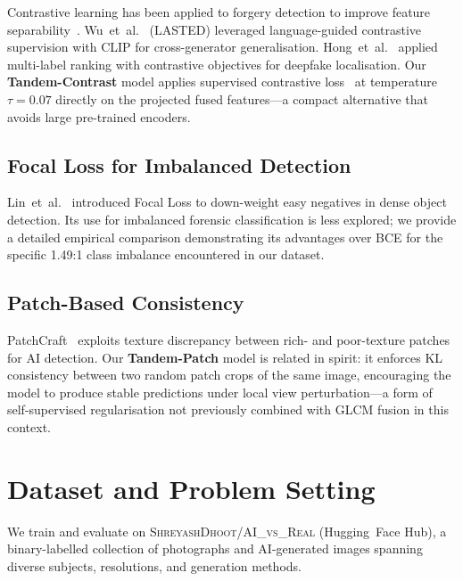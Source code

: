 \documentclass[10pt,twocolumn]{article}
\begin{document}
Contrastive learning has been applied to forgery detection to improve
feature separability~\cite{wu2023lasted,hong2024contrastive,
niloy2023cfl,gu2022hierarchical}.
Wu~et~al.~\cite{wu2023lasted} (LASTED) leveraged language-guided
contrastive supervision with CLIP for cross-generator generalisation.
Hong~et~al.~\cite{hong2024contrastive} applied multi-label ranking
with contrastive objectives for deepfake localisation.
Our \textbf{Tandem-Contrast} model applies supervised contrastive
loss~\cite{khosla2020supervised} at temperature $\tau=0.07$ directly
on the projected fused features---a compact alternative that avoids
large pre-trained encoders.

\subsection{Focal Loss for Imbalanced Detection}

Lin~et~al.~\cite{lin2017focal} introduced Focal Loss to down-weight
easy negatives in dense object detection.
Its use for imbalanced forensic classification is less
explored; we provide a detailed empirical comparison demonstrating its
advantages over BCE for the specific 1.49:1 class imbalance
encountered in our dataset.

\subsection{Patch-Based Consistency}

PatchCraft~\cite{zhong2023patchcraft} exploits texture discrepancy
between rich- and poor-texture patches for AI detection.
Our \textbf{Tandem-Patch} model is related in spirit: it enforces KL
consistency between two random patch crops of the same image,
encouraging the model to produce stable predictions under local view
perturbation---a form of self-supervised regularisation not previously
combined with GLCM fusion in this context.

\section{Dataset and Problem Setting}
\label{sec:dataset}

We train and evaluate on \textsc{ShreyashDhoot/AI\_vs\_Real}
(Hugging~Face Hub), a binary-labelled collection of photographs
and AI-generated images spanning diverse subjects, resolutions, and
generation methods.
\end{document}
